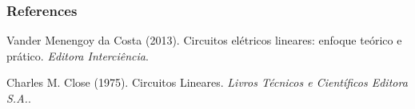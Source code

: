 \documentclass[mathserif,usenames,dvipsnames]{beamer}
\begin{document}
\begin{frame}
\frametitle{References}
\footnotesize{
	\begin{thebibliography}{99} %
		 Vander Menengoy da Costa (2013).
		\newblock Circuitos elétricos lineares: enfoque teórico e prático.
		\newblock \emph{Editora Interciência}.
		
		 Charles M. Close (1975).
		\newblock Circuitos Lineares.
		\newblock \emph{Livros Técnicos e Científicos Editora S.A.}.
	\end{thebibliography}
}
\end{frame}
\end{document}
